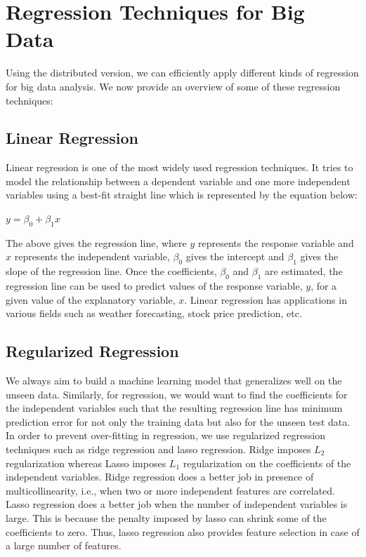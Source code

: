 \documentclass[sigconf]{acmart}
\begin{document}
\section{Regression Techniques for Big Data}

Using the distributed version, we can efficiently apply different kinds of regression for big data analysis. We now provide an overview of some of these regression techniques:

\subsection{Linear Regression}
Linear regression is one of the most widely used regression techniques. It tries to model the relationship between a dependent variable and one more independent variables using a best-fit straight line which is represented by the equation below:
\begin{center} $y = \beta_0 + \beta_1 x$ \end{center}
The above gives the regression line, where $y$ represents the response variable and $x$ represents the independent variable, $\beta_0$ gives the intercept and $\beta_1$ gives the slope of the regression line. Once the coefficients, $\beta_0$ and $\beta_1$ are estimated, the regression line can be used to predict values of the response variable, $y$, for a given value of the explanatory variable, $x$. Linear regression has applications in various fields such as weather forecasting, stock price prediction, etc.

\subsection{Regularized Regression}
We always aim to build a machine learning model that generalizes well on the unseen data. Similarly, for regression, we would want to find the coefficients for the independent variables such that the resulting regression line has minimum prediction error for not only the training data but also for the unseen test data. In order to prevent over-fitting in regression, we use regularized regression techniques such as ridge regression and lasso regression. Ridge imposes $L_2$ regularization whereas Lasso imposes $L_1$ regularization on the coefficients of the independent variables. Ridge regression does a better job in presence of multicollinearity, i.e., when two or more independent features are correlated. Lasso regression does a better job when the number of independent variables is large. This is because the penalty imposed by lasso can shrink some of the coefficients to zero. Thus, lasso regression also provides feature selection in case of a large number of features.
\end{document}
